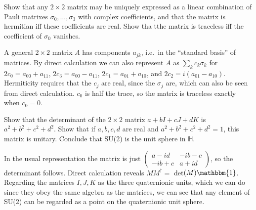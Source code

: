 \begin{p}%
\end{p}

\begin{p}%
\end{p}

\begin{p}%
\end{p}

\begin{p}%
\end{p}

\begin{p}%
\end{p}

\begin{p}%
{Show that any $2\times 2$ matrix may be uniquely expressed as a linear combination of Pauli matrixes $\sigma_0,\dots,\sigma_3$ with complex coefficients, and that the matrix is hermitian iff these coefficients are real. Show tha tthe matrix is traceless iff the coefficient of $\sigma_0$ vanishes.}
\end{p}
{A general
$2\times 2$ matrix $A$ has components $a_{jk}$, i.e.~in the ``standard basis'' of matrices. By direct calculation we can also represent $A$ as $\sum_{k}c_k\sigma_k$ for $2c_0=a_{00}+a_{11}$, $2c_3=a_{00}-a_{11}$, $2c_1=a_{01}+a_{10}$, and $2c_2=i(a_{01}-a_{10})$. Hermiticity requires
that the $c_j$ are real, since the $\sigma_j$ are, which can also be seen from direct calculation. $c_0$ is half the
trace, so the matrix is traceless exactly when $c_0=0$.}

\begin{p}%
\end{p}

\begin{p}%
{Show that the determinant of the $2\times 2$ matrix $a+bI+cJ+dK$ is $a^2+b^2+c^2+d^2$. Show that if $a,b,c,d$ are real and $a^2+b^2+c^2+d^2=1$, this matrix is unitary. Conclude that SU(2) is the unit sphere in $\mathbb{H}$.}
\end{p}
{In the usual representation the matrix is just $\left(\begin{array}{cc}a-id & -ib-c\\ -ib+c& a+id\end{array}\right)$, so the determinant follows. Direct calculation reveals $MM^\dagger=$ det$(M)\mathbbm{1}$. Regarding the matrices $I,J,K$ as the three quaternionic units, which we can do since they obey the same algebra as the matrices, we can see that any element of SU(2) can be regarded as a point
on the quaternionic unit sphere.}

